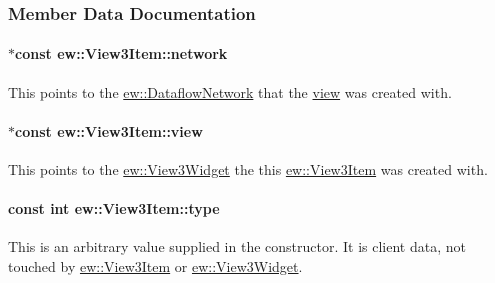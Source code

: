 \subsubsection{Member Data Documentation}
\hypertarget{classew_1_1View3Item_af6294268d63629c620cebb3ece227c20}{
\paragraph[{network}]{ $\ast$const {\bf ew::View3Item::network}}\hfill}
\label{classew_1_1View3Item_af6294268d63629c620cebb3ece227c20}
This points to the \hyperlink{classew_1_1DataflowNetwork}{ew::DataflowNetwork} that the \hyperlink{classew_1_1View3Item_a7d765842ec7b9e145cefa37e3dbae658}{view} was created with. \hypertarget{classew_1_1View3Item_a7d765842ec7b9e145cefa37e3dbae658}{
\paragraph[{view}]{ $\ast$const {\bf ew::View3Item::view}}\hfill}
\label{classew_1_1View3Item_a7d765842ec7b9e145cefa37e3dbae658}
This points to the \hyperlink{classew_1_1View3Widget}{ew::View3Widget} the this \hyperlink{classew_1_1View3Item}{ew::View3Item} was created with. \hypertarget{classew_1_1View3Item_a7e21fcde8f082ba2409bcb2999a4b7fd}{
\paragraph[{type}]{\setlength{\rightskip}{0pt plus 5cm}const int {\bf ew::View3Item::type}}\hfill}
\label{classew_1_1View3Item_a7e21fcde8f082ba2409bcb2999a4b7fd}
This is an arbitrary value supplied in the constructor. It is client data, not touched by \hyperlink{classew_1_1View3Item}{ew::View3Item} or \hyperlink{classew_1_1View3Widget}{ew::View3Widget}. 